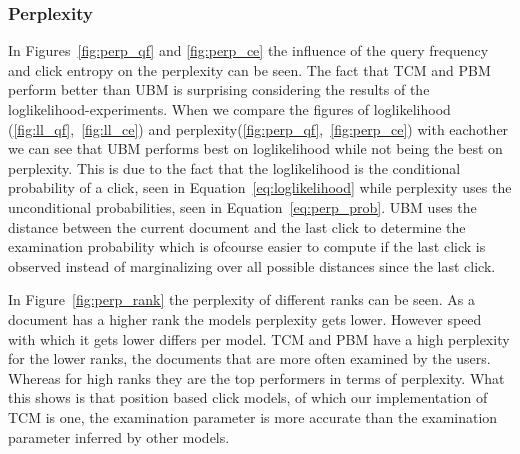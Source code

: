 \subsubsection{Perplexity}
In Figures~\ref{fig:perp_qf} and \ref{fig:perp_ce} the influence of the query frequency and click entropy on the perplexity can be seen. The fact that TCM and PBM perform better than UBM is surprising considering the results of the loglikelihood-experiments. When we compare the figures of loglikelihood (\ref{fig:ll_qf},~\ref{fig:ll_ce}) and perplexity(\ref{fig:perp_qf},~\ref{fig:perp_ce}) with eachother we can see that UBM performs best on loglikelihood while not being the best on perplexity. This is due to the fact that the loglikelihood is the conditional probability of a click, seen in Equation~\ref{eq:loglikelihood} while perplexity uses the unconditional probabilities, seen in Equation~\ref{eq:perp_prob}. UBM uses the distance between the current document and the last click to determine the examination probability which is ofcourse easier to compute if the last click is observed instead of marginalizing over all possible distances since the last click.

In Figure~\ref{fig:perp_rank} the perplexity of different ranks can be seen. As a document has a higher rank the models perplexity gets lower. However speed with which it gets lower differs per model. TCM and PBM have a high perplexity for the lower ranks, the documents that are more often examined by the users. Whereas for high ranks they are the top performers in terms of perplexity. What this shows is that position based click models, of which our implementation of TCM is one, the examination parameter is more accurate than the examination parameter inferred by other models.


